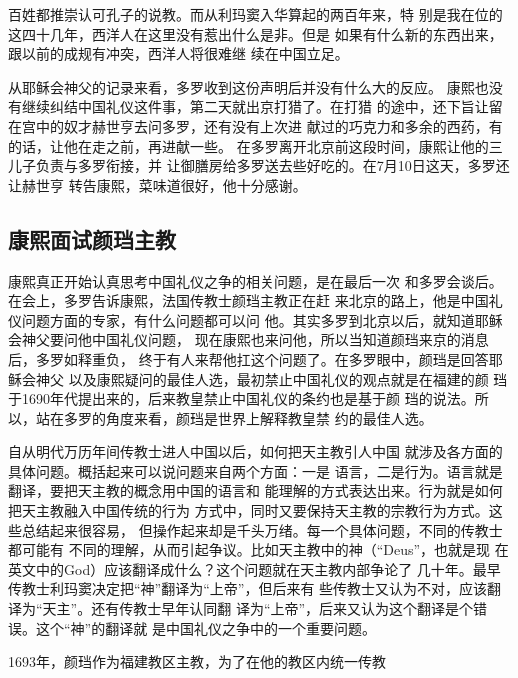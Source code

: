 {\bookkai 百姓都推崇认可孔子的说教。而从利玛窦入华算起的两百年来，特}%
{\bookkai 别是我在位的这四十几年，西洋人在这里没有惹出什么是非。但是}%
{\bookkai 如果有什么新的东西出来，跟以前的成规有冲突，西洋人将很难继}%
{\bookkai 续在中国立足。}%
\par
从耶稣会神父的记录来看，多罗收到这份声明后并没有什么大的反应。%
康熙也没有继续纠结中国礼仪这件事，第二天就出京打猎了。在打猎%
的途中，还下旨让留在宫中的奴才赫世亨去问多罗，还有没有上次进%
献过的巧克力和多余的西药，有的话，让他在走之前，再进献一些。%
在多罗离开北京前这段时间，康熙让他的三儿子负责与多罗衔接，并%
让御膳房给多罗送去些好吃的。在7月10日这天，多罗还让赫世亨%
转告康熙，菜味道很好，他十分感谢。%
\par
\subsection{康熙面试颜珰主教}
\par
康熙真正开始认真思考中国礼仪之争的相关问题，是在最后一次%
和多罗会谈后。在会上，多罗告诉康熙，法国传教士颜珰主教正在赶%
来北京的路上，他是中国礼仪问题方面的专家，有什么问题都可以问%
他。其实多罗到北京以后，就知道耶稣会神父要问他中国礼仪问题，%
现在康熙也来问他，所以当知道颜珰来京的消息后，多罗如释重负，%
终于有人来帮他扛这个问题了。在多罗眼中，颜珰是回答耶稣会神父%
以及康熙疑问的最佳人选，最初禁止中国礼仪的观点就是在福建的颜%
珰于1690年代提出来的，后来教皇禁止中国礼仪的条约也是基于颜%
珰的说法。所以，站在多罗的角度来看，颜珰是世界上解释教皇禁%
约的最佳人选。%
\par
自从明代万历年间传教士进人中国以后，如何把天主教引人中国%
就涉及各方面的具体问题。概括起来可以说问题来自两个方面：一是%
语言，二是行为。语言就是翻译，要把天主教的概念用中国的语言和%
能理解的方式表达出来。行为就是如何把天主教融入中国传统的行为%
方式中，同时又要保持天主教的宗教行为方式。这些总结起来很容易，%
但操作起来却是千头万绪。每一个具体问题，不同的传教士都可能有%
不同的理解，从而引起争议。比如天主教中的神（“Deus”，也就是现%
在英文中的God）应该翻译成什么？这个问题就在天主教内部争论了%
几十年。最早传教士利玛窦决定把“神”翻译为“上帝”，但后来有%
些传教士又认为不对，应该翻译为“天主”。还有传教士早年认同翻%
译为“上帝”，后来又认为这个翻译是个错误。这个“神”的翻译就%
是中国礼仪之争中的一个重要问题。%
\par
1693年，颜珰作为福建教区主教，为了在他的教区内统一传教%
